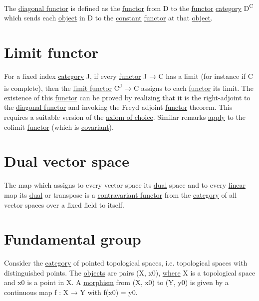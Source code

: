 \documentclass[a4paper,14pt,oneside]{book}
\begin{document}
The \hyperref[org6089988]{diagonal functor} is defined as the \hyperref[orgbabb870]{functor} from D to the \hyperref[orgbabb870]{functor} \hyperref[org5b9c164]{category} D\textsuperscript{C} which sends each \hyperref[orgfac6c8d]{object} in D to the \hyperref[orgd7109cb]{constant} \hyperref[orgbabb870]{functor} at that \hyperref[orgfac6c8d]{object}.

\chapter{\label{org008d4a6}Limit functor}
\label{sec:orgae84dde}

For a fixed index \hyperref[org5b9c164]{category} J, if every \hyperref[orgbabb870]{functor} J → C has a limit (for instance if C is complete), then the \hyperref[org008d4a6]{limit functor} C\textsuperscript{J} → C assigns to each \hyperref[orgbabb870]{functor} its limit. The existence of this \hyperref[orgbabb870]{functor} can be proved by realizing that it is the right-adjoint to the \hyperref[org6089988]{diagonal functor} and invoking the Freyd adjoint \hyperref[orgbabb870]{functor} theorem. This requires a suitable version of the \hyperref[orge4e1548]{axiom of choice}. Similar remarks \hyperref[org0327d56]{apply} to the colimit \hyperref[orgbabb870]{functor} (which is \hyperref[orge3bea44]{covariant}). 

\chapter{\label{org354ee27}Dual vector space}
\label{sec:orge8e7479}

The map which assigns to every vector space its \hyperref[orgc2f0c92]{dual} space and to every \hyperref[org8ea0167]{linear} map its \hyperref[orgc2f0c92]{dual} or transpose is a \hyperref[org3006250]{contravariant functor} from the \hyperref[org5b9c164]{category} of all vector spaces over a fixed field to itself.

\chapter{\label{orgb2c01ab}Fundamental group}
\label{sec:orga78b041}

Consider the \hyperref[org5b9c164]{category} of pointed topological spaces, i.e. topological spaces with distinguished points. The \hyperref[orge35d5e3]{objects} are pairs (X, x0), \hyperref[orgb660a1e]{where} X is a topological space and x0 is a point in X. A \hyperref[org8239425]{morphism} from (X, x0) to (Y, y0) is given by a continuous map f : X → Y with f(x0) = y0.
\end{document}
